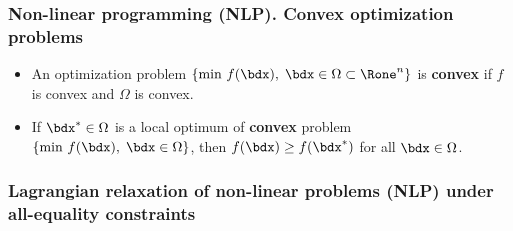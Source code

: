 \documentclass[a4paper]{article}
\begin{document}
\subsubsection*{Non-linear programming (NLP). Convex optimization problems}%

\begin{itemize}
  \item An optimization problem $\{\text{min}~f(\bdx), \; \bdx\in\Omega\subset\Rone^n\}$
    is \textbf{convex} if $f$ is convex
    and $\Omega$ is convex.
  \item If $\bdx^*\in\Omega$ is  a local optimum of \textbf{convex} problem
    $\{\text{min}~f(\bdx), \; \bdx\in\Omega\}$, then $f(\bdx)\ge f(\bdx^*)$ for all $\bdx\in\Omega$.
\end{itemize}%

\subsubsection*{Lagrangian relaxation of non-linear problems (NLP) under all-equality constraints}%
\end{document}
